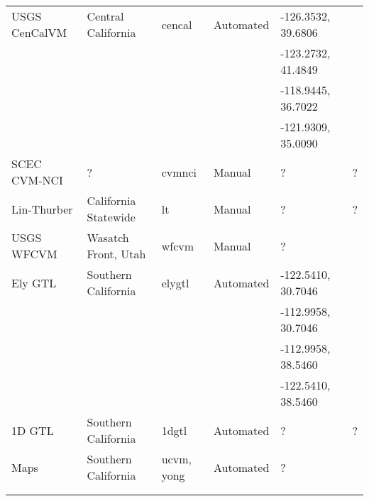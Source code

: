 \begin{table*}[t]
\begin{tabular}[]{lllllp{1.25in}}
USGS CenCalVM      & Central California    & cencal        &  Automated   & -126.3532, 39.6806 & \citet{Brocher_2005_Tech}    \\
                   &                       &               &              & -123.2732, 41.4849 & \citet{Brocher_2006_Proc}    \\
                   &                       &               &              & -118.9445, 36.7022 &                              \\
                   &                       &               &              & -121.9309, 35.0090 &                              \\
SCEC CVM-NCI       & ?                     & cvmnci        &  Manual      & ?                  & ?                            \\
Lin-Thurber        & California Statewide  & lt            &  Manual      & ?                  & ?                            \\
USGS WFCVM         & Wasatch Front, Utah   & wfcvm         &  Manual      & ?                  & \citet{Magistrale_2006_Tech} \\
\hline
Ely GTL            & Southern California   & elygtl        &  Automated   & -122.5410, 30.7046 & \citet{Ely_2010_AGU}         \\
                   &                       &               &              & -112.9958, 30.7046 &                              \\
                   &                       &               &              & -112.9958, 38.5460 &                              \\
                   &                       &               &              & -122.5410, 38.5460 &                              \\
1D GTL             & Southern California   & 1dgtl         &  Automated   & ?                  & ?                            \\
\hline
\vsthirty{} Maps   & Southern California   & ucvm, yong    & Automated    & ?                  & \citet{Wills_2006_BSSA}      \\
                   &                       &               &              &                    & \citet{Wald_2007_BSSA}       \\
                   &                       &               &              &                    & \citet{Yong_2012_BSSA}       \\
\hline
\end{tabular}
\label{tab:cvms}
\end{table*}


